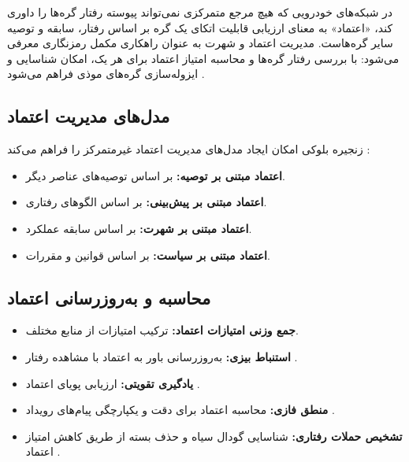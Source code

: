 \documentclass[12pt,a4paper]{article}
\begin{document}
در شبکه‌های خودرویی که هیچ مرجع متمرکزی نمی‌تواند پیوسته رفتار گره‌ها را داوری کند، «اعتماد» به معنای ارزیابی قابلیت اتکای یک گره بر اساس رفتار، سابقه و توصیه سایر گره‌هاست. مدیریت اعتماد و شهرت به عنوان راهکاری مکمل رمزنگاری معرفی می‌شود: با بررسی رفتار گره‌ها و محاسبه امتیاز اعتماد برای هر یک، امکان شناسایی و ایزوله‌سازی گره‌های موذی فراهم می‌شود \cite{razaBlockchainBasedReputationTrust2024}.

\subsection{مدل‌های مدیریت اعتماد}

زنجیره بلوکی امکان ایجاد مدل‌های مدیریت اعتماد غیرمتمرکز را فراهم می‌کند \cite{razaBlockchainBasedReputationTrust2024, ghovanlooyghajarSBTMSScalableBlockchain2021}:

\begin{itemize}
  \item \textbf{اعتماد مبتنی بر توصیه:} بر اساس توصیه‌های عناصر دیگر.
  \item \textbf{اعتماد مبتنی بر پیش‌بینی:} بر اساس الگوهای رفتاری.
  \item \textbf{اعتماد مبتنی بر شهرت:} بر اساس سابقه عملکرد.
  \item \textbf{اعتماد مبتنی بر سیاست:} بر اساس قوانین و مقررات.
\end{itemize}

\subsection{محاسبه و به‌روزرسانی اعتماد}

\begin{itemize}
  \item \textbf{جمع وزنی امتیازات اعتماد:} ترکیب امتیازات از منابع مختلف.
  \item \textbf{استنباط بیزی:} به‌روزرسانی باور به اعتماد با مشاهده رفتار \cite{ghovanlooyghajarSBTMSScalableBlockchain2021}.
  \item \textbf{یادگیری تقویتی:} ارزیابی پویای اعتماد \cite{farsimadanReviewSecurityChallenges2025}.
  \item \textbf{منطق فازی:} محاسبه اعتماد برای دقت و یکپارچگی پیام‌های رویداد \cite{farsimadanReviewSecurityChallenges2025}.
  \item \textbf{تشخیص حملات رفتاری:} شناسایی گودال سیاه و حذف بسته از طریق کاهش امتیاز اعتماد \cite{farsimadanReviewSecurityChallenges2025}.
\end{itemize}
\end{document}
